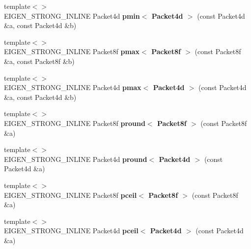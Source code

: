 \begin{DoxyCompactItemize}
{\footnotesize template$<$$>$ }\\E\+I\+G\+E\+N\+\_\+\+S\+T\+R\+O\+N\+G\+\_\+\+I\+N\+L\+I\+NE Packet4d {\bfseries pmin$<$ Packet4d $>$} (const Packet4d \&a, const Packet4d \&b)
\item 
\mbox{\label{namespace_eigen_1_1internal_a190c34785e0f92dea3f8786b8330063a}} 
{\footnotesize template$<$$>$ }\\E\+I\+G\+E\+N\+\_\+\+S\+T\+R\+O\+N\+G\+\_\+\+I\+N\+L\+I\+NE Packet8f {\bfseries pmax$<$ Packet8f $>$} (const Packet8f \&a, const Packet8f \&b)
\item 
\mbox{\label{namespace_eigen_1_1internal_a6fcd20f386e9d69cb78d4dbb38d15a93}} 
{\footnotesize template$<$$>$ }\\E\+I\+G\+E\+N\+\_\+\+S\+T\+R\+O\+N\+G\+\_\+\+I\+N\+L\+I\+NE Packet4d {\bfseries pmax$<$ Packet4d $>$} (const Packet4d \&a, const Packet4d \&b)
\item 
\mbox{\label{namespace_eigen_1_1internal_ac5dff5e387be3a0c5da2f1f5e7e306c5}} 
{\footnotesize template$<$$>$ }\\E\+I\+G\+E\+N\+\_\+\+S\+T\+R\+O\+N\+G\+\_\+\+I\+N\+L\+I\+NE Packet8f {\bfseries pround$<$ Packet8f $>$} (const Packet8f \&a)
\item 
\mbox{\label{namespace_eigen_1_1internal_aa8bc5fc719ce0a8e9e5c53909d0d4dcd}} 
{\footnotesize template$<$$>$ }\\E\+I\+G\+E\+N\+\_\+\+S\+T\+R\+O\+N\+G\+\_\+\+I\+N\+L\+I\+NE Packet4d {\bfseries pround$<$ Packet4d $>$} (const Packet4d \&a)
\item 
\mbox{\label{namespace_eigen_1_1internal_a8ea44b7eb4f4f4c7093021b13592d8c8}} 
{\footnotesize template$<$$>$ }\\E\+I\+G\+E\+N\+\_\+\+S\+T\+R\+O\+N\+G\+\_\+\+I\+N\+L\+I\+NE Packet8f {\bfseries pceil$<$ Packet8f $>$} (const Packet8f \&a)
\item 
\mbox{\label{namespace_eigen_1_1internal_a3a056b00c84dcf391ef081de4b340384}} 
{\footnotesize template$<$$>$ }\\E\+I\+G\+E\+N\+\_\+\+S\+T\+R\+O\+N\+G\+\_\+\+I\+N\+L\+I\+NE Packet4d {\bfseries pceil$<$ Packet4d $>$} (const Packet4d \&a)

\end{DoxyCompactItemize}
